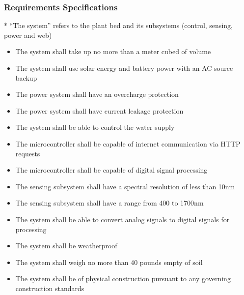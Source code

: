 \subsubsection{Requirements Specifications}
* ``The system'' refers to the plant bed and its subsystems (control, sensing, power and web)
\begin{itemize}
  \item The system shall take up no more than a meter cubed of volume
  \item The system shall use solar energy and battery power with an AC source backup
  \item The power system shall have an overcharge protection
  \item The power system shall have current leakage protection
  \item The system shall be able to control the water supply
  \item The microcontroller shall be capable of internet communication via HTTP requests
  \item The microcontroller shall be capable of digital signal processing
  \item The sensing subsystem shall have a spectral resolution of less than 10nm
  \item The sensing subsystem shall have a range from 400 to 1700nm
  \item The system shall be able to convert analog signals to digital signals for processing
  \item The system shall be weatherproof
  \item The system shall weigh no more than 40 pounds empty of soil
  \item The system shall be of physical construction pursuant to any governing construction standards
\end{itemize}
